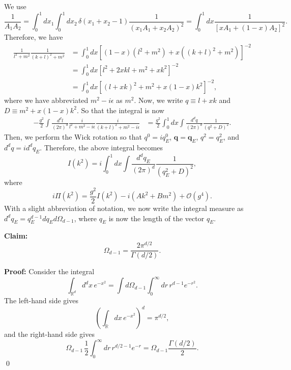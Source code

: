 We use 
\begin{equation}
    \frac{1}{A_1A_2} = \int^1_0dx_1\int^1_0dx_2\,\delta(x_1+x_2-1)\frac{1}{(x_1A_1 + x_2A_2)^2} = \int^1_0 dx\frac{1}{[xA_1 +(1-x)A_2]^2}.
\end{equation}
Therefore, we have
\begin{equation}
    \begin{aligned}
        \frac{1}{l^2+m^2}\frac{1}{(k+l)^2+m^2} &= \int^1_0dx[(1-x)(l^2+m^2) + x((k+l)^2+m^2)]^{-2}\\
        &=\int^1_0 dx [l^2+2xkl+m^2+xk^2]^{-2}\\
        &=\int^1_0 dx [(l+xk)^2+m^2 +x(1-x)k^2]^{-2},
    \end{aligned}
\end{equation}
where we have abbreviated $m^2-i\epsilon$ as $m^2$.
Now, we write $q\equiv l+xk$ and $D \equiv m^2 +x(1-x)k^2$. So that the integral is now
\begin{equation}
    \begin{aligned}
        - \frac{g^2}{2}\int \frac{d^dl}{(2\pi)^d} \frac{i}{l^2+m^2-i\epsilon}\frac{i}{(k+l)^2+m^2-i\epsilon} &=\frac{g^2}{2}\int^1_0dx\int\frac{d^dq}{(2\pi)^d}\frac{1}{(q^2+D)^2}.
    \end{aligned}
\end{equation}
Then, we perform the Wick rotation so that $q^0 = iq^0_E$, $\mathbf{q} = \mathbf{q}_E$, $q^2 = q^2_E$, and $d^dq = id^dq_E$. Therefore, the above integral becomes
\begin{equation}
    I(k^2) = i\int^1_0dx\int\frac{d^dq_E}{(2\pi)^d}\frac{1}{(q_E^2+D)^2},
\end{equation}
where 
\begin{equation}
    i\Pi(k^2) = \frac{g^2}{2}I(k^2)-i(Ak^2+Bm^2) + \mathcal{O}(g^4).
\end{equation}
With a slight abbreviation of notation, we now write the integral measure as $d^dq_E = q_E^{d-1}dq_Ed\Omega_{d-1}$, where $q_E$ is now the length of the vector $q_E$.

\noindent \textbf{Claim:}
\begin{equation}
    \Omega_{d-1} = \frac{2\pi^{d/2}}{\Gamma(d/2)}.
\end{equation}

\noindent \textbf{Proof:} Consider the integral
\begin{equation}
    \int_{\mathbb{R}^d}d^dx\, e^{-x^2} = \int d\Omega_{d-1}\int_0^\infty dr\,r^{d-1}e^{-r^2}. 
\end{equation}
The left-hand side gives
\begin{equation}
    \left(\int_\mathbb{R}dx\, e^{-x^2}\right)^d =  \pi^{d/2},
\end{equation}
and the right-hand side gives
\begin{equation}
    \Omega_{d-1}\,\frac{1}{2}\int_0^\infty dr \, r^{d/2-1}e^{-r} = \Omega_{d-1}\frac{\Gamma(d/2)}{2}.
\end{equation}
\qed

